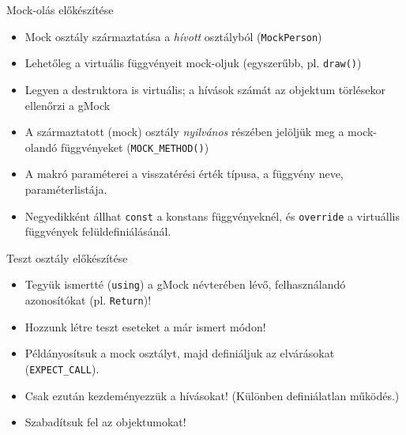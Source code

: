 \documentclass[usenames,dvipsnames,aspectratio=169]{beamer}
\begin{document}
\begin{frame}
    Mock-olás előkészítése
    \begin{itemize}
        \item Mock osztály származtatása a \emph{hívott} osztályból (\texttt{MockPerson})
        \item Lehetőleg a virtuális függvényeit mock-oljuk (egyszerűbb, pl. \texttt{draw()})
        \item Legyen a destruktora is virtuális; a hívások számát az objektum törlésekor ellenőrzi a gMock
        \item A származtatott (mock) osztály \emph{nyilvános} részében jelöljük meg a mock-olandó függvényeket (\texttt{MOCK\_METHOD()})
        \item A makró paraméterei a visszatérési érték típusa, a függvény neve, paraméterlistája.
        \item Negyedikként állhat \texttt{const} a konstans függvényeknél, és \texttt{override} a virtuállis függvények felüldefiniálásánál.
    \end{itemize}
\end{frame}

\begin{frame}
    \begin{exampleblock}{}
        \footnotesize
        
    \end{exampleblock}
\end{frame}

\begin{frame}
    Teszt osztály előkészítése
    \begin{itemize}
        \item Tegyük ismertté (\texttt{using}) a gMock névterében lévő, felhasználandó azonosítókat (pl. \texttt{Return})!
        \item Hozzunk létre teszt eseteket a már ismert módon!
        \item Példányosítsuk a mock osztályt, majd definiáljuk az elvárásokat (\texttt{EXPECT\_CALL}).
        \item Csak ezután kezdeményezzük a hívásokat! (Különben definiálatlan működés.)
        \item Szabadítsuk fel az objektumokat!
    \end{itemize}
\end{frame}

\begin{frame}
    \begin{exampleblock}{}
        \footnotesize
        
    \end{exampleblock}
\end{frame}
\end{document}
